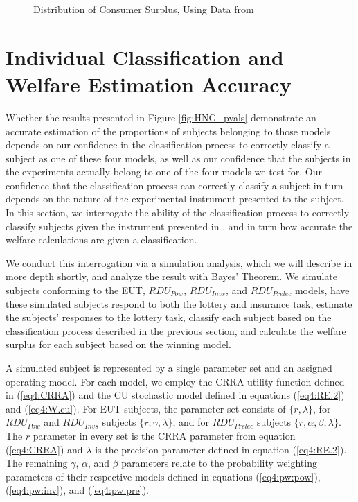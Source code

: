 \documentclass[../main.tex]{subfiles}
\begin{document}
\begin{figure}[h!]
	\center
	\caption{Distribution of Consumer Surplus, Using Data from \textcite{Harrison2016}}
	\label{fig:HNG_CS}
\end{figure}

\section{Individual Classification and Welfare Estimation Accuracy}
\label{sec4:IC}

Whether the results presented in Figure \ref{fig:HNG_pvals} demonstrate an accurate estimation of the proportions of subjects belonging to those models depends on our confidence in the classification process to correctly classify a subject as one of these four models, as well as our confidence that the subjects in the experiments actually belong to one of the four models we test for.
Our confidence that the classification process can correctly classify a subject in turn depends on the nature of the experimental instrument presented to the subject.
In this section, we interrogate the ability of the classification process to correctly classify subjects given the instrument presented in \textcite{Harrison2016}, and in turn how accurate the welfare calculations are given a classification.

We conduct this interrogation via a simulation analysis, which we will describe in more depth shortly, and analyze the result with Bayes' Theorem.
We simulate subjects conforming to the EUT, $\mathit{RDU_{Pow}}$, $\mathit{RDU_{Invs}}$, and $\mathit{RDU_{Prelec}}$ models, have these simulated subjects respond to both the lottery and insurance task, estimate the subjects' responses to the lottery task, classify each subject based on the classification process described in the previous section, and calculate the welfare surplus for each subject based on the winning model.

A simulated subject is represented by a single parameter set and an assigned operating model.
For each model, we employ the CRRA utility function defined in (\ref{eq4:CRRA}) and the CU stochastic model defined in equations (\ref{eq4:RE.2}) and (\ref{eq4:W.cu}).
For EUT subjects, the parameter set consists of $\lbrace r, \lambda \rbrace$, for $\mathit{RDU_{Pow}}$ and $\mathit{RDU_{Invs}}$ subjects $\lbrace r, \gamma, \lambda \rbrace$, and for $\mathit{RDU_{Prelec}}$ subjects $\lbrace r, \alpha, \beta, \lambda \rbrace$.
The $r$ parameter in every set is the CRRA parameter from equation (\ref{eq4:CRRA}) and $\lambda$ is the precision parameter defined in equation (\ref{eq4:RE.2}).
The remaining $\gamma$, $\alpha$, and $\beta$ parameters relate to the probability weighting parameters of their respective models defined in equations (\ref{eq4:pw:pow}), (\ref{eq4:pw:inv}), and (\ref{eq4:pw:pre}).
\end{document}
